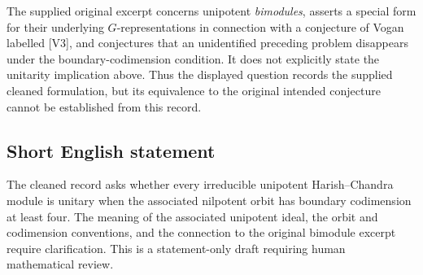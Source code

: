 \documentclass[11pt]{article}
\begin{document}
The supplied original excerpt concerns unipotent \emph{bimodules}, asserts a special form for their underlying \(G\)-representations in connection with a conjecture of Vogan labelled [V3], and conjectures that an unidentified preceding problem disappears under the boundary-codimension condition. It does not explicitly state the unitarity implication above. Thus the displayed question records the supplied cleaned formulation, but its equivalence to the original intended conjecture cannot be established from this record.
\subsection{Short English statement}
The cleaned record asks whether every irreducible unipotent Harish--Chandra module is unitary when the associated nilpotent orbit has boundary codimension at least four. The meaning of the associated unipotent ideal, the orbit and codimension conventions, and the connection to the original bimodule excerpt require clarification. This is a statement-only draft requiring human mathematical review.
\end{document}
